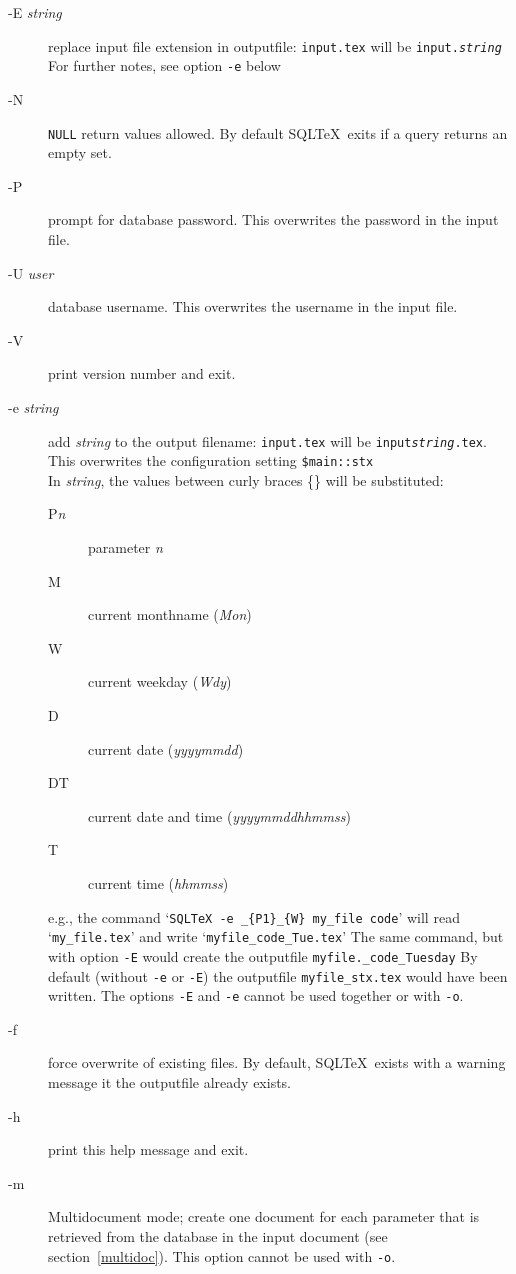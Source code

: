 \documentclass{article}
\begin{document}
\begin{description}
\item[-E \textit{string}] replace input file extension in outputfile:
\texttt{input.tex} will be \texttt{input.\textit{string}} \\
For further notes, see option \texttt{-e} below
\item[-N] \texttt{NULL} return values allowed. By default SQL\TeX\ exits if a
query returns an empty set.
\item[-P] prompt for database password. This overwrites the password in the
input file.
\item[-U \textit{user}] database username. This overwrites the username in the
input file.
\item[-V] print version number and exit.
\item[-e \textit{string}] add \textit{string} to the output filename:
\texttt{input.tex} will be \texttt{input\textit{string}.tex}. This overwrites
the configuration setting \texttt{\$main::stx} \\
In \textit{string}, the values between curly braces \{\} will be substituted:
\begin{description}
\item[P\textit{n}] parameter \textit{n}
\item[M] current monthname (\textit{Mon})
\item[W] current weekday (\textit{Wdy})
\item[D] current date (\textit{yyyymmdd})
\item[DT] current date and time (\textit{yyyymmddhhmmss})
\item[T] current time (\textit{hhmmss})
\end{description}
e.g., the command `\texttt{SQLTeX -e \_\{P1\}\_\{W\} my\_file code}'
will read `\texttt{my\_file.tex}' and write `\texttt{myfile\_code\_Tue.tex}'
The same command, but with option \texttt{-E} would create the
outputfile \texttt{myfile.\_code\_Tuesday}
By default (without \texttt{-e} or \texttt{-E}) the outputfile
\texttt{myfile\_stx.tex} would have been written.
The options \texttt{-E} and \texttt{-e} cannot be used together or with \texttt{-o}.
\item[-f] force overwrite of existing files. By default, SQL\TeX\ exists with a
warning message it the outputfile already exists.
\item[-h] print this help message and exit.
\item[-m] Multidocument mode; create one document for each parameter that is retrieved
from the database in the input document (see section~\ref{multidoc}). This option cannot be used with \texttt{-o}.



\end{description}
\end{document}
